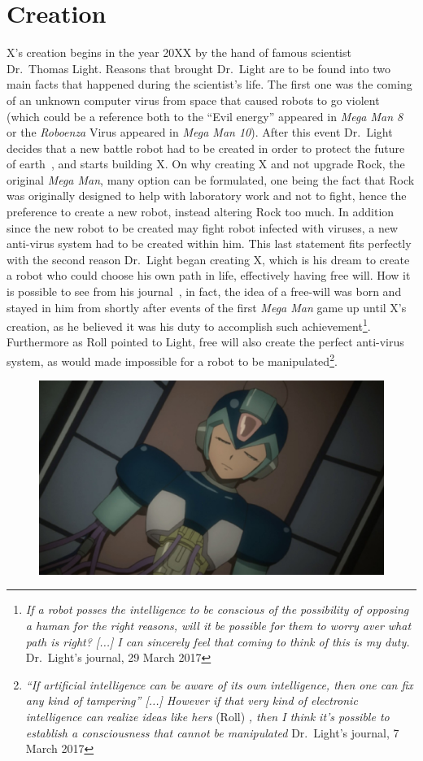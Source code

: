 \section{Creation}
X's creation begins in the year 20XX by the hand of famous scientist Dr.~Thomas Light. Reasons that brought Dr.~Light are to be found into two main facts that happened during the scientist's life. The first one was the coming of an unknown computer virus from space that caused robots to go violent (which could be a reference both to the ``Evil energy'' appeared in \emph{Mega Man 8} or the \textit{Roboenza} Virus appeared in \emph{Mega Man 10}). After this event Dr.~Light decides that a new battle robot had to be created in order to protect the future of earth~\cite{mega_man_network:Zero_timeline}, and starts building X. On why creating X and not upgrade Rock, the original \textit{Mega Man}, many option can be formulated, one being the fact that Rock was originally designed to help with laboratory work and not to fight, hence the preference to create a new robot, instead altering Rock too much. In addition since the new robot to be created may fight robot infected with viruses, a new anti-virus system had to be created within him. This last statement fits perfectly with the second reason Dr.~Light began creating X, which is his dream to create a robot who could choose his own path in life, effectively having free will. How it is possible to see from his journal~\cite{Dr.Light_journal}, in fact, the idea of a free-will was born and stayed in him from shortly after events of the first \textit{Mega Man} game up until X's creation, as he believed it was his duty to accomplish such achievement\footnote{\textit{If a robot posses the intelligence to be conscious of the possibility of opposing a human for the right reasons, will it be possible for them to worry aver what path is right? [...] I can sincerely feel that coming to think of this is my duty.} Dr.~Light's journal, 29 March 2017}. Furthermore as Roll pointed to Light, free will also create the perfect anti-virus system, as would made impossible for a robot to be manipulated\footnote{\textit{``If artificial intelligence can be aware of its own intelligence, then one can fix any kind of tampering'' [...] However if that very kind of electronic intelligence can realize ideas like hers} (Roll) \textit{, then I think it's possible to establish a consciousness that cannot be manipulated} Dr.~Light's journal, 7 March 2017}. 
\begin{figure}[htp]
	\centering
	\includegraphics[width=0.7\linewidth]{figures/Characters/Char_X_build.jpg}
\end{figure}
